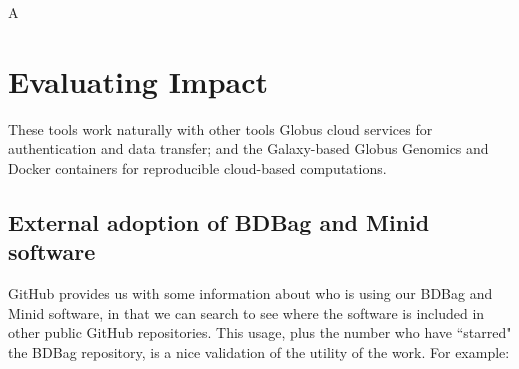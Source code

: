\documentclass[11pt]{article}
\begin{document}
A


\section{Evaluating Impact}

These tools work naturally with other tools
Globus cloud services for authentication and data transfer; 
and the Galaxy-based Globus Genomics and Docker containers for reproducible cloud-based computations. 


\subsection{External adoption of BDBag and Minid software}

GitHub provides us with some information about who is using our BDBag and Minid software,
in that we can search to see where the software is included in other public GitHub repositories. 
This usage, plus the number who have ``starred" the BDBag repository, is a nice validation of the
utility of the work. For example:
\end{document}
